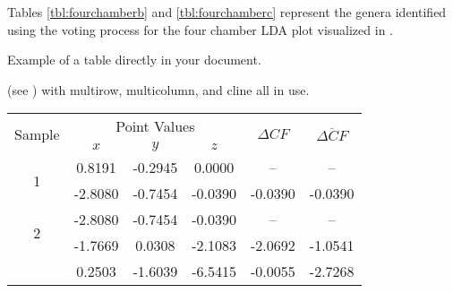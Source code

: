   \begin{table}[!htb]
      \raggedright
      Tables \ref{tbl:fourchamberb} and \ref{tbl:fourchamberc} represent the genera identified using the voting process for the four chamber LDA plot visualized in .\vskip 11pt
      \begin{minipage}{.5\linewidth}
        \centering
        \label{tbl:fourchamberb}
      \end{minipage}%
      \begin{minipage}{.5\linewidth}
        \centering
        \label{tbl:fourchamberc}
      \end{minipage}
  \end{table}


Example of a table directly in your document.

(see ) with multirow, multicolumn, and cline all in use.
\begin{table}[h!]
\label{tbl:tbl_1}
\begin{center}
\begin{tabular}{|c||c|c|c||c|c|}
\hline
\multirow{2}{*}{Sample} & \multicolumn{3}{|c||}{Point Values} & \multirow{2}{*}{${\Delta}CF$}& \multirow{2}{*}{$\overline{{\Delta}CF}$} \\ \cline{2-4}
& $x$ & $y$ & $z$ &  & \\ \hline
\multirow{2}{*}{1} & 0.8191 & -0.2945 & 0.0000 & -- & -- \\ \cline{2-6}
 & -2.8080 & -0.7454 & -0.0390 & -0.0390 & -0.0390 \\ \hline 
\multirow{2}{*}{2} & -2.8080 & -0.7454 & -0.0390 & -- & -- \\ \cline{2-6}
 & -1.7669 & 0.0308 & -2.1083 & -2.0692 & -1.0541 \\ \hline 
 & 0.2503 & -1.6039 & -6.5415 & -0.0055 & -2.7268 \\ \hline
 \end{tabular}
\end{center}
\end{table}

